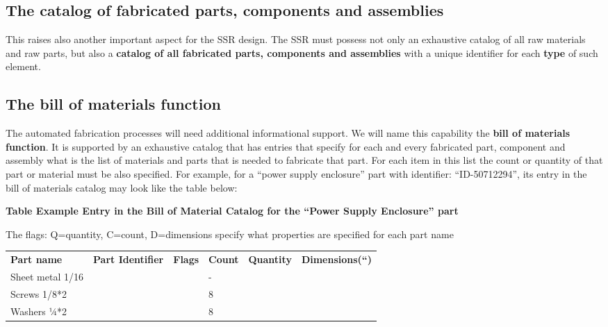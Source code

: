 \bigskip

\subsection[The catalog of fabricated parts, components and
assemblies]{The catalog of fabricated parts, components and assemblies}
\hypertarget{RefHeading3060306210128}{}This raises also another
important aspect for the SSR design. The SSR must possess not only an
exhaustive catalog of all raw materials and raw parts, but also a
\textbf{catalog of all fabricated parts, components and assemblies
}with a unique identifier for each \textbf{type} of such element. 


\bigskip

\subsection[The bill of materials function]{The bill of materials
function}
\hypertarget{RefHeading3062306210128}{}The automated fabrication
processes will need additional informational support. We will name this
capability the \textbf{bill of materials function}. It is supported by
an exhaustive catalog that has entries that specify for each and every
fabricated part, component and assembly what is the list of materials
and parts that is needed to fabricate that part. For each item in this
list the count or quantity of that part or material must be also
specified. For example, for a “power supply enclosure” part with
identifier:  “ID-50712294”, its entry in the bill of materials catalog
may look like the table below:


\bigskip

{\bfseries
Table  Example Entry in the Bill of Material Catalog for the
``Power Supply Enclosure'' part}

The flags: Q=quantity, C=count, D=dimensions specify what properties are
specified for each part name


\bigskip

\begin{flushleft}
\tablehead{}
\begin{supertabular}{|m{1.3094599in}m{1.3573599in}m{0.9837598in}m{0.6705598in}m{0.82335985in}m{1.0323598in}|}
\hline
\textbf{Part name} &
\textbf{Part Identifier} &
\textbf{Flags} &
\textbf{Count} &
\textbf{Quantity} &
\textbf{Dimensions(“)}\\
Sheet metal  1/16 &
~
 &
~
 &
{}- &
~
 &
~
\\
Screws 1/8*2 &
~
 &
~
 &
8 &
~
 &
~
\\
Washers  ¼*2 &
~
 &
~
 &
8 &
~
 &
~
\\\hline
\end{supertabular}
\end{flushleft}

